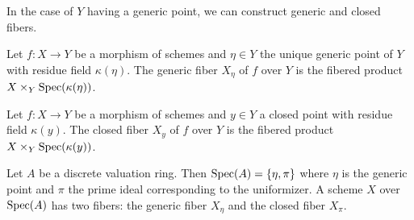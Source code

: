 In the case of $Y$ having a generic point, we can construct generic and closed fibers. 
\begin{definition}\label{def: generic fiber}
    Let $f:X\to Y$ be a morphism of schemes and $\eta\in Y$ the unique generic point of $Y$ with residue field $\kappa(\eta)$. The generic fiber $X_{\eta}$ of $f$ over $Y$ is the fibered product $X\times_{Y}\operatorname{Spec}(\kappa(\eta))$.
\end{definition}
\begin{definition}\label{def: closed fiber}
    Let $f:X\to Y$ be a morphism of schemes and $y\in Y$ a closed point with residue field $\kappa(y)$. The closed fiber $X_{y}$ of $f$ over $Y$ is the fibered product $X\times_{Y}\operatorname{Spec}(\kappa(y))$.
\end{definition}
\begin{example}
    Let $A$ be a discrete valuation ring. Then $\operatorname{Spec}(A)=\{\eta,\pi\}$ where $\eta$ is the generic point and $\pi$ the prime ideal corresponding to the uniformizer. A scheme $X$ over $\operatorname{Spec}(A)$ has two fibers: the generic fiber $X_{\eta}$ and the closed fiber $X_{\pi}$. 
\end{example}